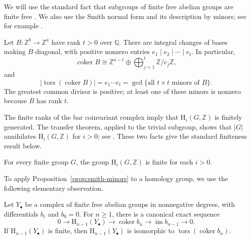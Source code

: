 \documentclass[11pt,a4paper]{amsart}
\numberwithin{equation}{section}
\DeclareMathOperator{\im}{im}
\newcommand{\HH}{\mathrm H}
\newcommand{\Z}{\mathbb Z}
\newcommand{\Q}{\mathbb Q}
\begin{document}
We will use the standard fact that subgroups of finite free
abelian groups are finite free
\cite[Corollary~4.15(i), p.~163]{Rot}. We also use the Smith normal
form and its description by minors; see for example
\cite[Theorems~2.1(4) and~2.4]{Sta}.

\begin{proposition}\label{prop:smith-minors}
Let $B:\Z^b\to\Z^a$ have rank $t>0$ over $\Q$.
There are integral changes of bases making $B$ diagonal, with
positive nonzero entries $e_1\mid e_2\mid\cdots\mid e_t$.
In particular,
\[
 \operatorname{coker}B\cong
 \Z^{a-t}\oplus\bigoplus_{j=1}^t\Z/e_j\Z,
\]
and
\[
 |\operatorname{tors}(\operatorname{coker}B)|
 =e_1\cdots e_t
 =\gcd\{\text{all }t\times t\text{ minors of }B\}.
\]
The greatest common divisor is positive; at least one of these
minors is nonzero because $B$ has rank $t$.
\end{proposition}

The finite ranks of the bar coinvariant complex imply that
$\HH_i(G,\Z)$ is finitely generated. The transfer theorem,
applied to the trivial subgroup, shows that $|G|$ annihilates
$\HH_i(G,\Z)$ for $i>0$; see
\cite[Theorem~9.94, p.~577]{Rot}. These two facts give the
standard finiteness result below.

\begin{lemma}\label{lem:finite-homology}
For every finite group $G$, the group $\HH_i(G,\Z)$ is finite
for each $i>0$.
\end{lemma}

To apply Proposition~\ref{prop:smith-minors} to a homology group,
we use the following elementary observation.

\begin{lemma}\label{lem:homology-cokernel}
Let $Y_\bullet$ be a complex of finite free abelian groups in
nonnegative degrees, with differentials $b_i$ and $b_0=0$.
For $n\geq1$, there is a canonical exact sequence
\[
 0\longrightarrow\HH_{n-1}(Y_\bullet)
 \longrightarrow\operatorname{coker}b_n
 \longrightarrow\im b_{n-1}\longrightarrow0.
\]
If $\HH_{n-1}(Y_\bullet)$ is finite,  then $\HH_{n-1}(Y_\bullet)$ is isomorphic to $\operatorname{tors}(\operatorname{coker}b_n)$.
\end{lemma}
\end{document}
